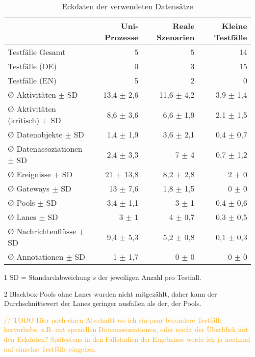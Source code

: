\begin{table}[htbp]
    \centering
    \begin{threeparttable}
    \caption{Eckdaten der verwendeten Datensätze}
    \label{tab:datensaetze-eckdaten}
    \begin{tabular}{l r r r}
        \toprule
        & Uni-Prozesse & Reale Szenarien & Kleine Testfälle \\
        \midrule
        Testfälle Gesamt                  & 5  & 5 & 14 \\
        Testfälle (DE)                    & 0 & 3 & 15 \\
        Testfälle (EN)                    & 5 & 2 & 0 \\
        Ø Aktivitäten $\pm$ SD\tnote{1}   & 13,4 $\pm$ 2,6 & 11,6 $\pm$ 4,2 & 3,9 $\pm$ 1,4 \\
        Ø Aktivitäten (kritisch) $\pm$ SD & 8,6 $\pm$ 3,6 & 6,6 $\pm$ 1,9 & 2,1 $\pm$ 1,5 \\
        Ø Datenobjekte $\pm$ SD           & 1,4 $\pm$ 1,9 & 3,6 $\pm$ 2,1 & 0,4 $\pm$ 0,7 \\
        Ø Datenassoziationen $\pm$ SD     & 2,4 $\pm$ 3,3 & 7 $\pm$ 4 & 0,7 $\pm$ 1,2 \\
        Ø Ereignisse $\pm$ SD             & 21 $\pm$ 13,8 & 8,2 $\pm$ 2,8 & 2 $\pm$ 0 \\
        Ø Gateways $\pm$ SD               & 13 $\pm$ 7,6 & 1,8 $\pm$ 1,5 & 0 $\pm$ 0 \\
        Ø Pools $\pm$ SD                  & 3,4 $\pm$ 1,1 & 3 $\pm$ 1 & 0,4 $\pm$ 0,6 \\
        Ø Lanes $\pm$ SD\tnote{2}         & 3 $\pm$ 1 & 4 $\pm$ 0,7 & 0,3 $\pm$ 0,5 \\
        Ø Nachrichtenflüsse $\pm$ SD      & 9,4 $\pm$ 5,3 & 5,2 $\pm$ 0,8 & 0,1 $\pm$ 0,3 \\
        Ø Annotationen $\pm$ SD           & 1 $\pm$ 1,7 & 0 $\pm$ 0 & 0 $\pm$ 0 \\
        \bottomrule
    \end{tabular}
    \begin{tablenotes}
        \item[1] SD = Standardabweichung $s$ der jeweiligen Anzahl pro Testfall.
        \item[2] Blackbox-Pools ohne Lanes wurden nicht mitgezählt, daher kann der Durchschnittswert der Lanes geringer ausfallen als der, der Pools.
    \end{tablenotes}
    \end{threeparttable}
\end{table}

\textcolor{orange}{// TODO Hier noch einen Abschnitt wo ich ein paar besondere Testfälle hervorhebe, z.B. mit speziellen Datenassoziationen, oder reicht der Überblick mit den Eckdaten? Spätestens in den Fallstudien der Ergebnisse werde ich ja nochmal auf einzelne Testfälle eingehen.}